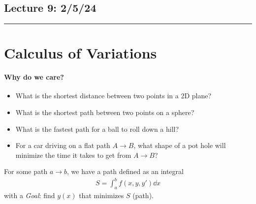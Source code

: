 \documentclass[../main.tex]{subfiles}
\begin{document}
\subsection*{Lecture 9: \hfill  2/5/24}
\hrule \vspace{10px}
\section{Calculus of Variations}

\paragraph*{Why do we care?}
\begin{itemize}
    \item What is the shortest distance between two points in a 2D plane?
    \item What is the shortest path between two points on a sphere?
    \item What is the fastest path for a ball to roll down a hill?
    \item For a car driving on a flat path $A \to B$, what shape of a pot hole will minimize
    the time it takes to get from $A \to B$?
\end{itemize}

For some path $a \to b$, we have a path defined as an integral
\begin{align*}
    S = \int_a^b f(x, y, y') \dd x
\end{align*}
with a \emph{Goal}: find $y(x)$ that minimizes $S$ (path).
\end{document}
